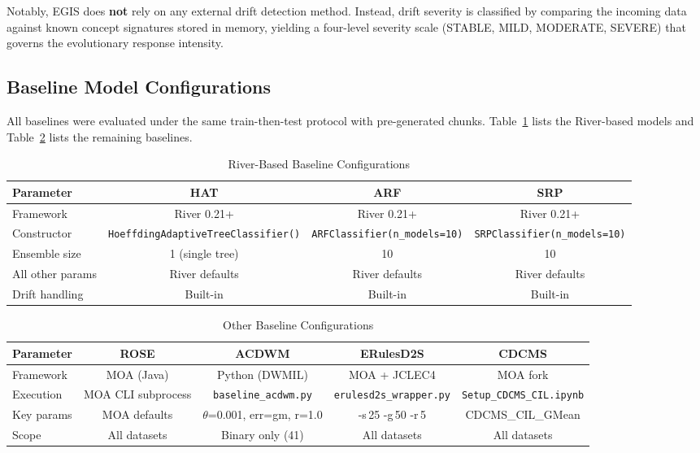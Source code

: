 \documentclass[lettersize,10pt]{article}
\begin{document}
Notably, EGIS does \textbf{not} rely on any external drift detection method. Instead, drift severity is classified by comparing the incoming data against known concept signatures stored in memory, yielding a four-level severity scale (STABLE, MILD, MODERATE, SEVERE) that governs the evolutionary response intensity.

\subsection{Baseline Model Configurations}
\label{sec:s1_baselines}
All baselines were evaluated under the same train-then-test protocol with pre-generated chunks. Table~\ref{tab:s_baselines_river} lists the River-based models and Table~\ref{tab:s_baselines_other} lists the remaining baselines.

\begin{table}[htbp]
\centering
\caption{River-Based Baseline Configurations}
\label{tab:s_baselines_river}
\footnotesize
\begin{tabular}{lccc}
\toprule
\textbf{Parameter} & \textbf{HAT} & \textbf{ARF} & \textbf{SRP} \\
\midrule
Framework & River 0.21+ & River 0.21+ & River 0.21+ \\
Constructor & \texttt{HoeffdingAdaptiveTreeClassifier()} & \texttt{ARFClassifier(n\_models=10)} & \texttt{SRPClassifier(n\_models=10)} \\
Ensemble size & 1 (single tree) & 10 & 10 \\
All other params & River defaults & River defaults & River defaults \\
Drift handling & Built-in & Built-in & Built-in \\
\bottomrule
\end{tabular}
\end{table}

\begin{table}[htbp]
\centering
\caption{Other Baseline Configurations}
\label{tab:s_baselines_other}
\footnotesize
\begin{tabular}{lcccc}
\toprule
\textbf{Parameter} & \textbf{ROSE} & \textbf{ACDWM} & \textbf{ERulesD2S} & \textbf{CDCMS} \\
\midrule
Framework & MOA (Java) & Python (DWMIL) & MOA + JCLEC4 & MOA fork \\
Execution & MOA CLI subprocess & \texttt{baseline\_acdwm.py} & \texttt{erulesd2s\_wrapper.py} & \texttt{Setup\_CDCMS\_CIL.ipynb} \\
Key params & MOA defaults & $\theta$=0.001, err=gm, r=1.0 & -s\,25 -g\,50 -r\,5 & CDCMS\_CIL\_GMean \\
Scope & All datasets & Binary only (41) & All datasets & All datasets \\
\bottomrule
\end{tabular}
\end{table}
\end{document}
